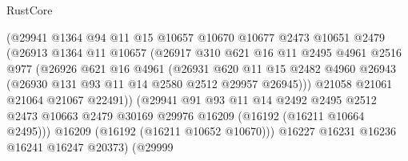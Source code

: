 \begin{lexlean}{RustCore}
\begin{coremodule}
                            (@29941
                              @1364
                              @94
                              @11
                              @15
                              @10657
                              @10670
                              @10677
                              @2473
                              @10651
                              @2479
                              (@26913
                                @1364
                                @11
                                @10657
                                (@26917
                                  @310
                                  @621
                                  @16
                                  @11
                                  @2495
                                  @4961
                                  @2516
                                  @977
                                  (@26926
                                    @621
                                    @16
                                    @4961
                                    (@26931
                                      @620
                                      @11
                                      @15
                                      @2482
                                      @4960
                                      @26943
                                      (@26930 @131 @93 @11 @14 @2580 @2512 @29957 @26945)))
                                  @21058
                                  @21061
                                  @21064
                                  @21067
                                  @22491))
                              (@29941
                                @91
                                @93
                                @11
                                @14
                                @2492
                                @2495
                                @2512
                                @2473
                                @10663
                                @2479
                                @30169
                                @29976
                                @16209
                                (@16192 (@16211 @10664 @2495)))
                              @16209
                              (@16192 (@16211 @10652 @10670)))
                            @16227
                            @16231
                            @16236
                            @16241
                            @16247
                            @20373)
                          (@29999

\end{coremodule}
\end{lexlean}
